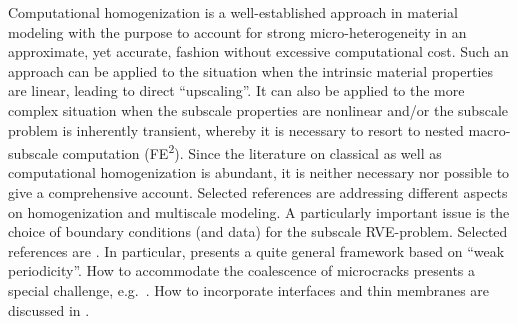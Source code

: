 \documentclass{bmcart}
\begin{document}
Computational homogenization is a well-established approach in material modeling with the purpose to account for strong micro-heterogeneity in an approximate, yet accurate, fashion without excessive computational cost.
Such an approach can be applied to the situation when the intrinsic material properties are linear, leading to direct ``upscaling''.
It can also be applied to the more complex situation when the subscale properties are nonlinear and/or the subscale problem is inherently transient, whereby it is necessary to resort to nested macro-subscale computation (FE\textsuperscript{2}).
%
Since the literature on classical as well as computational homogenization is abundant,
it is neither necessary nor possible to give a comprehensive account.
Selected references are \cite{torquato_random_2006, zohdi_introduction_2004,fish_practical_2013} addressing different aspects on homogenization and multiscale modeling.
A particularly important issue is the choice of boundary conditions (and data) for the subscale RVE-problem.
Selected references are \cite{geers_multi-scale_2010,temizer_optimality_2013}.
In particular, \cite{larsson_computational_2011} presents a quite general framework based on ``weak periodicity''.
How to accommodate the coalescence of microcracks presents a special challenge, e.g.\ \cite{coenen_multi-scale_2012}.
How to incorporate interfaces and thin membranes are discussed in \cite{mcbride_micro--macro_2012, larsson_stress-resultant_2013}.


% 
\end{document}
